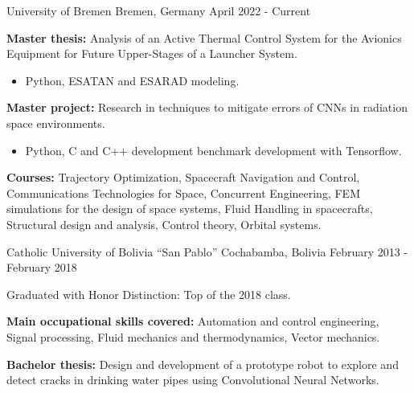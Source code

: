 

\begin{cventries}
  {University of Bremen}
  {Bremen, Germany}
  {April 2022 - Current}
  {
    \begin{cvitems}
      \item \textbf{Master thesis:} Analysis of an Active Thermal
      Control System for the Avionics Equipment for Future
      Upper-Stages of a Launcher System.
      \begin{itemize}
        \item[\bullet] Python, ESATAN and ESARAD modeling. 
      \end{itemize}
      \item \textbf{Master project:} Research in techniques to
      mitigate errors of CNNs in radiation space environments.
      \begin{itemize}
        \item[\bullet] Python, C and C++ development benchmark
        development with Tensorflow. 
      \end{itemize}
      \item \textbf{Courses:} Trajectory Optimization, Spacecraft
      Navigation and Control, Communications Technologies for Space,
      Concurrent Engineering, FEM simulations for the design of space
      systems, Fluid Handling in spacecrafts, Structural design and
      analysis, Control theory, Orbital systems.
    \end{cvitems}
  }

  {Catholic University of Bolivia ``San Pablo''}
  {Cochabamba, Bolivia}
  {February 2013 - February 2018}
  {
    \begin{cvitems}
      \item Graduated with Honor Distinction: Top of the 2018 class.
      \item \textbf{Main occupational skills covered:} Automation and
      control engineering, Signal processing, Fluid mechanics and
      thermodynamics, Vector mechanics.
      \item \textbf{Bachelor thesis:} Design and development of a
      prototype robot to explore and detect cracks in drinking water
      pipes using Convolutional Neural Networks.
    \end{cvitems}
  }


\end{cventries}
